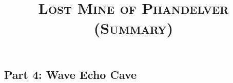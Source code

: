 \documentclass{article}
\title{\textsc{\Huge Lost Mine of Phandelver (Summary)}}
\date{ }
\begin{document}
	\maketitle
	\tableofcontents
	\pagebreak
	\begin{multicols}{2}

	
	\vfill
	\pagebreak
	
	\vfill
	\pagebreak
	
	\vfill
	\pagebreak
	
	\vfill
	\pagebreak


	
	\section{Part 4: Wave Echo Cave}
	
	\end{multicols}
	
\end{document}
